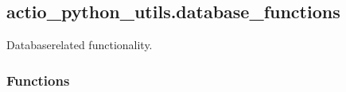\documentclass[letterpaper,10pt,english]{sphinxmanual}
\begin{document}
\sphinxstepscope


\subsection{actio\_python\_utils.database\_functions}
\label{\detokenize{_autosummary/actio_python_utils.database_functions:module-actio_python_utils.database_functions}}\label{\detokenize{_autosummary/actio_python_utils.database_functions:actio-python-utils-database-functions}}\label{\detokenize{_autosummary/actio_python_utils.database_functions::doc}}
\sphinxAtStartPar
Database\sphinxhyphen{}related functionality.
\subsubsection*{Functions}
\end{document}

